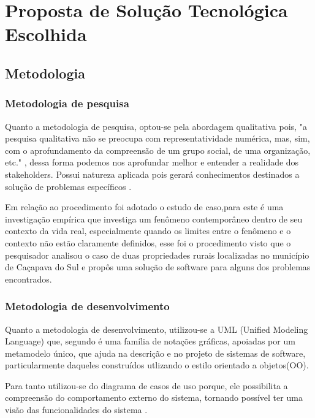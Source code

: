 \documentclass[12pt]{article}
\begin{document}
	\newpage

	\section{Proposta de Solução Tecnológica Escolhida}

	\subsection{Metodologia}
    
    \subsubsection{Metodologia de pesquisa}

	Quanto a metodologia de pesquisa, optou-se pela abordagem qualitativa pois, "a pesquisa qualitativa não se preocupa com representatividade numérica, mas, sim, com o aprofundamento da compreensão de um grupo social, de uma organização, etc." \cite{ufrgs09}, dessa forma podemos nos aprofundar melhor e entender a realidade dos stakeholders. Possui natureza aplicada pois gerará conhecimentos destinados a solução de problemas específicos \cite{ufrgs09} .

	Em relação ao procedimento foi adotado o estudo de caso,para  este é uma investigação empírica que investiga um fenômeno contemporâneo dentro de seu contexto da vida real, especialmente quando os limites entre o fenômeno e o contexto não estão claramente definidos, esse foi o procedimento visto que o pesquisador analisou o caso de duas propriedades rurais localizadas no município de Caçapava do Sul e propôs uma solução de software para alguns dos problemas encontrados.

	\subsubsection{Metodologia de desenvolvimento}
    
    Quanto a metodologia de desenvolvimento, utilizou-se a UML (Unified Modeling Language) que, segundo  é uma família de notações gráficas, apoiadas por um metamodelo único, que ajuda na descrição e no projeto de sistemas de software, particularmente daqueles construídos utlizando o estilo orientado a objetos(OO).
    
    Para tanto utilizou-se do diagrama de casos de uso porque, ele possibilita a compreensão do comportamento externo do sistema, tornando possível ter uma visão das funcionalidades do sistema \cite{guedes18}.
    
\end{document}
